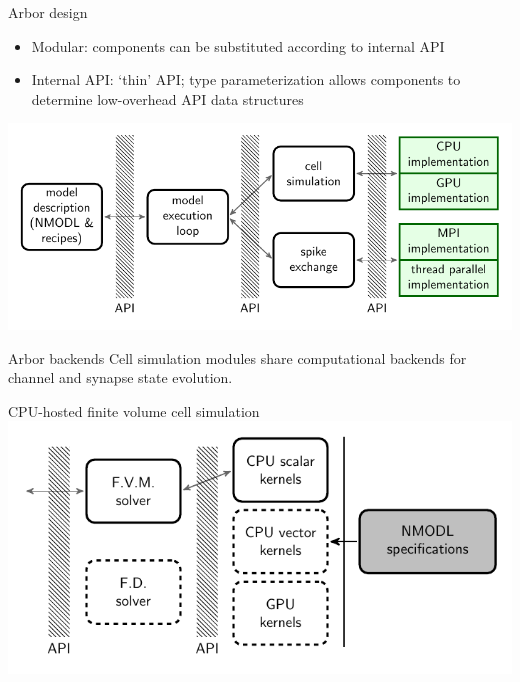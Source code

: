 \documentclass[t]{beamer}
\begin{document}
{

}


\begin{frame}{Arbor design}
    \begin{itemize}
    \item Modular: components can be substituted according to internal API
    \item Internal API: `thin' API; type parameterization allows components to determine low-overhead API data structures
    \end{itemize}
    \begin{center}
      \includegraphics[width=.9\textwidth]{api.pdf}
    \end{center}
  \end{frame}
  
  
  \begin{frame}{Arbor backends}
    Cell simulation modules share computational backends for channel and synapse state evolution.
  
    \vfill
    \centering
    CPU-hosted finite volume cell simulation\\
    \vspace{2ex}
    \includegraphics[height=0.5\textheight]{backend-api.pdf}
  
    \vfill
  \end{frame}
  
\end{document}
